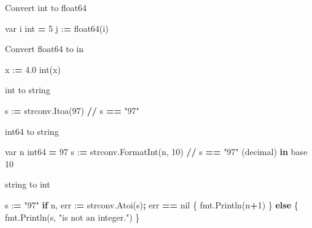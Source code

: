 \documentclass[]{book}
\newenvironment{Shaded}{\begin{snugshade}}{\end{snugshade}}
\newcommand{\BuiltInTok}[1]{#1}
\newcommand{\ControlFlowTok}[1]{\textcolor[rgb]{0.13,0.29,0.53}{\textbf{#1}}}
\newcommand{\DecValTok}[1]{\textcolor[rgb]{0.00,0.00,0.81}{#1}}
\newcommand{\FloatTok}[1]{\textcolor[rgb]{0.00,0.00,0.81}{#1}}
\newcommand{\KeywordTok}[1]{\textcolor[rgb]{0.13,0.29,0.53}{\textbf{#1}}}
\newcommand{\NormalTok}[1]{#1}
\newcommand{\OperatorTok}[1]{\textcolor[rgb]{0.81,0.36,0.00}{\textbf{#1}}}
\newcommand{\StringTok}[1]{\textcolor[rgb]{0.31,0.60,0.02}{#1}}
\begin{document}
Convert int to float64

\begin{Shaded}
\begin{Highlighting}[]
\NormalTok{var i }\BuiltInTok{int} \OperatorTok{=} \DecValTok{5}
\NormalTok{j :}\OperatorTok{=}\NormalTok{ float64(i)}
\end{Highlighting}
\end{Shaded}

Convert float64 to in

\begin{Shaded}
\begin{Highlighting}[]
\NormalTok{x :}\OperatorTok{=} \FloatTok{4.0}
\BuiltInTok{int}\NormalTok{(x)}
\end{Highlighting}
\end{Shaded}

int to string

\begin{Shaded}
\begin{Highlighting}[]
\NormalTok{s :}\OperatorTok{=}\NormalTok{ strconv.Itoa(}\DecValTok{97}\NormalTok{) }\OperatorTok{//}\NormalTok{ s }\OperatorTok{==} \StringTok{"97"}
\end{Highlighting}
\end{Shaded}

int64 to string

\begin{Shaded}
\begin{Highlighting}[]
\NormalTok{var n int64 }\OperatorTok{=} \DecValTok{97}
\NormalTok{s :}\OperatorTok{=}\NormalTok{ strconv.FormatInt(n, }\DecValTok{10}\NormalTok{) }\OperatorTok{//}\NormalTok{ s }\OperatorTok{==} \StringTok{"97"}\NormalTok{ (decimal) }\KeywordTok{in}\NormalTok{ base }\DecValTok{10}
\end{Highlighting}
\end{Shaded}

string to int

\begin{Shaded}
\begin{Highlighting}[]
\NormalTok{s :}\OperatorTok{=} \StringTok{"97"}
\ControlFlowTok{if}\NormalTok{ n, err :}\OperatorTok{=}\NormalTok{ strconv.Atoi(s)}\OperatorTok{;}\NormalTok{ err }\OperatorTok{==}\NormalTok{ nil \{}
\NormalTok{    fmt.Println(n}\OperatorTok{+}\DecValTok{1}\NormalTok{)}
\NormalTok{\} }\ControlFlowTok{else}\NormalTok{ \{}
\NormalTok{    fmt.Println(s, }\StringTok{"is not an integer."}\NormalTok{)}
\NormalTok{\}}
\end{Highlighting}
\end{Shaded}
\end{document}
